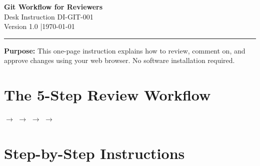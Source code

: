 \documentclass[11pt, letterpaper]{article}
\begin{document}
\begin{center}
{\LARGE\bfseries Git Workflow for Reviewers}\\[4pt]
{\large Desk Instruction DI-GIT-001}\\[4pt]
{\small Version 1.0 \quad|\quad \today}
\end{center}

\vspace{-6pt}
\noindent\rule{\textwidth}{0.5pt}

\textbf{Purpose:} This one-page instruction explains how to review, comment on, and approve changes using your web browser. No software installation required.

\section*{The 5-Step Review Workflow}

\begin{center}
 $\rightarrow$
 $\rightarrow$
 $\rightarrow$
 $\rightarrow$
\end{center}

\section*{Step-by-Step Instructions}
\end{document}
